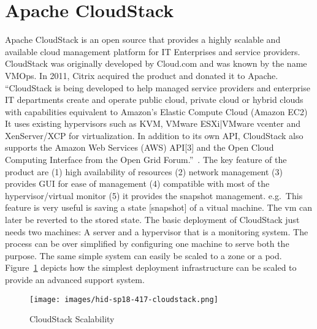 
\section{Apache CloudStack}

Apache CloudStack is an open source that provides a highly scalable
and available cloud management platform for IT Enterprises and service
providers. CloudStack was originally developed by Cloud.com and was
known by the name VMOps.  In 2011, Citrix acquired the product and
donated it to Apache.  ``CloudStack is being developed to help managed
service providers and enterprise IT departments create and operate
public cloud, private cloud or hybrid clouds with capabilities
equivalent to Amazon's Elastic Compute Cloud (Amazon EC2) It uses
existing hypervisors such as KVM, VMware ESXi|VMware vcenter and
XenServer/XCP for virtualization. In addition to its own API,
CloudStack also supports the Amazon Web Services (AWS) API[3] and the
Open Cloud Computing Interface from the Open Grid
Forum.''~\cite{hid-sp18-417-wiki-cloudStack}.  The key feature of the
product are (1) high availability of resources (2) network management
(3) provides GUI for ease of management (4) compatible with most of
the hypervisor/virtual monitor (5) it provides the snapshot
management. e.g.\ This feature is very useful is saving a state
[snapshot] of a vitual machine.  The vm can later be reverted to the
stored state.  The basic deployment of CloudStack just needs two
machines: A server and a hypervisor that is a monitoring system.  The
process can be over simplified by configuring one machine to serve
both the purpose.  The same simple system can easily be scaled to a
zone or a pod.  Figure~\ref{F:cloudstack-scalabuility} depicts how the
simplest deployment infrastructure can be scaled to provide an
advanced support system.


\begin{figure}[htb]
\texttt{[image: images/hid-sp18-417-cloudstack.png]}
\caption{CloudStack Scalability~\cite{hid-sp18-417-cloudstack-scaling}}
\label{F:cloudstack-scalabuility}
\end{figure}
